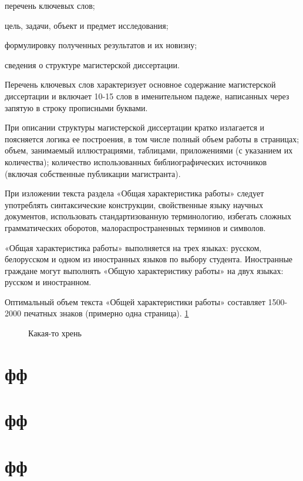 \documentclass{mpaper}
\begin{document}
    перечень ключевых слов;

    цель, задачи, объект и предмет исследования;

    формулировку полученных результатов и их новизну;

    сведения о структуре магистерской диссертации.

    Перечень ключевых слов характеризует основное содержание магистерской диссертации и включает 10-15 слов в именительном падеже, написанных через запятую в строку прописными буквами.

    При описании структуры магистерской диссертации кратко излагается и поясняется логика ее построения, в том числе полный объем работы в страницах; объем, занимаемый иллюстрациями, таблицами, приложениями (с указанием их количества); количество использованных библиографических источников (включая собственные публикации магистранта).

    При изложении текста раздела «Общая характеристика работы»
    следует употреблять синтаксические конструкции, свойственные языку
    научных документов, использовать стандартизованную терминологию,
    избегать сложных грамматических оборотов, малораспространенных
    терминов и символов.

    «Общая характеристика работы» выполняется на трех языках: русском, белорусском и одном из иностранных языков по выбору студента. Иностранные граждане могут выполнять «Общую характеристику работы» на двух языках: русском и иностранном.

    Оптимальный объем текста «Общей характеристики работы» составляет 1500-2000 печатных знаков (примерно одна страница). \cref{fig:1}

    \begin{figure}
        \centering
        \caption{Какая-то хрень}\label{fig:1}
    \end{figure}

    \section{фф}

    \section{фф}

    \section{фф}
\end{document}
